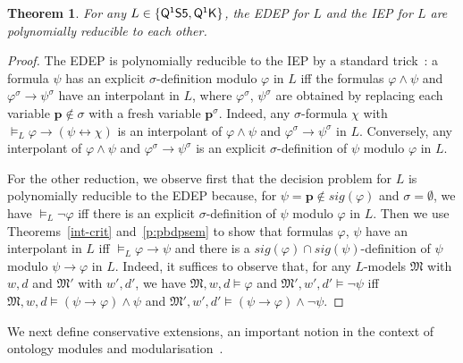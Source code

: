 \documentclass[10pt,a4paper]{amsart}
\theoremstyle{plain}
\newtheorem{thm}{Theorem}[section]
\theoremstyle{definition}
\newcommand{\sig}{\mathit{sig}}
\newcommand{\QSF}{\ensuremath{\smash{\mathsf{Q^1S5}}}}
\newcommand{\QK}{\ensuremath{\smash{\mathsf{Q^1K}}}}
\newcommand{\fform}[1]{\boldsymbol{#1}}
\newcommand{\pvar}{\fform{p}}
\begin{document}
\begin{thm}\label{p:cipvspbdp}
For any $L \in \{\QSF, \QK\}$, the EDEP for $L$ and the IEP for $L$ are polynomially reducible to each other.
\end{thm}
%
\begin{proof}
The	EDEP is polynomially reducible to the IEP by a standard trick~\cite{MGabbay2005-MGAIAD}: a formula $\psi$ has an explicit $\sigma$-definition modulo $\varphi$ in $L$ iff the formulas $\varphi \land \psi$ and $\varphi^\sigma \to \psi^\sigma$ have an interpolant in $L$, where $\varphi^\sigma$, $\psi^\sigma$ are obtained by replacing each variable $\pvar \notin \sigma$ with a fresh variable $\pvar^\sigma$. Indeed, any $\sigma$-formula $\chi$ with $\models_L\varphi\to(\psi\leftrightarrow\chi)$ is an interpolant of $\varphi \land \psi$ and $\varphi^\sigma \to \psi^\sigma$ in $L$. 
	Conversely, any interpolant of $\varphi \land \psi$ and $\varphi^\sigma \to \psi^\sigma$ is an explicit $\sigma$-definition of $\psi$ modulo $\varphi$ in $L$.
	
	For the other reduction, we observe first that the decision problem for $L$ is polynomially reducible to the EDEP because, for $\psi = \pvar \notin \sig(\varphi)$ and $\sigma = \emptyset$, we have $\models_L \neg \varphi$ iff there is an explicit $\sigma$-definition of $\psi$ modulo $\varphi$ in $L$.
	Then we use Theorems~\ref{int-crit} and~\ref{p:pbdpsem} to show that formulas $\varphi$, $\psi$ have an interpolant in $L$ iff $\models_{L}\varphi\to\psi$ and there is a $\sig(\varphi) \cap \sig(\psi)$-definition of $\psi$ modulo $\psi \to \varphi$ in $L$. 
	Indeed, it suffices to observe that, for any $L$-models $\mathfrak M$ with $w,d$ and $\mathfrak M'$ with $w',d'$, we have 
	$\mathfrak M,w,d\models\varphi$ and $\mathfrak M',w',d'\models\neg\psi$ iff  
	$\mathfrak M,w,d\models (\psi\to\varphi)\land\psi$ and $\mathfrak M',w',d' \models (\psi\to\varphi)\land\neg\psi$.
\end{proof}

We next define conservative extensions, an important notion in the context of ontology modules and modularisation~\cite{GrauHKS08,DBLP:conf/rweb/BotoevaKLRWZ16}.
\end{document}
